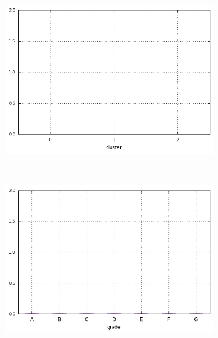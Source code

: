 \begin{anexosenv}
\begin{figure}[t!]
\begin{subfigure}[t]{0.45\textwidth}
        \end{subfigure}
\end{figure}



\begin{figure}[ht!]
    \centering
                \caption{\emph{Boxplots} de pub\textunderscore rec}
        \begin{subfigure}[t]{0.45\textwidth}
            \centering

            \centerline{\includegraphics[width=1.05\textwidth]{img/pub_rec_by_cluster}}
        \end{subfigure}%
        ~ 
        \begin{subfigure}[t]{0.45\textwidth}
            \centering
   
            \centerline{\includegraphics[width=1.05\textwidth]{img/pub_rec_by_grade}}


\end{subfigure}
\end{figure}
\end{anexosenv}
